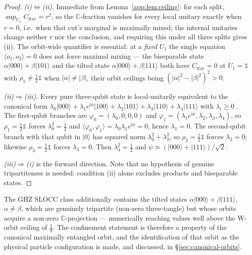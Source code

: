 \begin{proof}
\emph{(i)$\Leftrightarrow$(ii).} Immediate from Lemma~\ref{app:lem:ceiling}: for each split,
$\sup_{U_1}C_{\mathrm{frac}} = r^2$, so the $\mathbb{C}$-fraction vanishes for every local unitary
exactly when $r = 0$, i.e.\ when that cut's marginal is maximally mixed; the internal unitaries
change neither $r$ nor the conclusion, and requiring this under all three splits gives (ii). The
orbit-wide quantifier is essential: at a \emph{fixed} $U_1$ the single equation
$\langle o_1,o_2\rangle = 0$ does not force maximal mixing --- the biseparable state
$\alpha\lvert000\rangle+\beta\lvert101\rangle$ and the tilted state
$\alpha\lvert000\rangle+\beta\lvert111\rangle$ both have $C_{\mathrm{frac}} = 0$ at $U_1=\mathbb{1}$
with $\rho_1\neq\tfrac12\mathbb{1}$ when $|\alpha|\neq|\beta|$, their orbit ceilings being
$(|\alpha|^2-|\beta|^2)^2 > 0$.

\emph{(ii)$\Rightarrow$(iii).} Every pure three-qubit state is local-unitarily equivalent to the
canonical form
$\lambda_0\lvert000\rangle + \lambda_1e^{\mathrm{i}\phi}\lvert100\rangle + \lambda_2\lvert101\rangle
+ \lambda_3\lvert110\rangle + \lambda_4\lvert111\rangle$ with $\lambda_i\ge0$
\autocite{acin2000generalized}. The first-qubit branches are $\varphi_0 = (\lambda_0,0,0,0)$ and
$\varphi_1 = (\lambda_1e^{\mathrm{i}\phi},\lambda_2,\lambda_3,\lambda_4)$, so
$\rho_1 = \tfrac12\mathbb{1}$ forces $\lambda_0^2 = \tfrac12$ and
$\langle\varphi_0,\varphi_1\rangle = \lambda_0\lambda_1e^{\mathrm{i}\phi} = 0$, hence
$\lambda_1 = 0$. The second-qubit branch with that qubit in $\lvert0\rangle$ has squared norm
$\lambda_0^2+\lambda_2^2$, so $\rho_2 = \tfrac12\mathbb{1}$ forces $\lambda_2 = 0$; likewise
$\rho_3 = \tfrac12\mathbb{1}$ forces $\lambda_3 = 0$. Then $\lambda_4^2 = \tfrac12$ and
$\psi \simeq (\lvert000\rangle+\lvert111\rangle)/\sqrt2$.

\emph{(iii)$\Rightarrow$(i)} is the forward direction. Note that no hypothesis of genuine
tripartiteness is needed: condition (ii) alone excludes products and biseparable states.
\end{proof}

\begin{remark}
The GHZ SLOCC class additionally contains the tilted states
$\alpha\lvert000\rangle+\beta\lvert111\rangle$, $\alpha\neq\beta$, which are genuinely tripartite
(non-zero three-tangle) but whose orbits acquire a non-zero $\mathbb{C}$-projection --- numerically
reaching values well above the W-orbit ceiling of $\tfrac19$. The confinement statement is therefore
a property of the canonical maximally entangled orbit, and the identification of that orbit as the
physical particle configuration is made, and discussed, in \S\ref{sec:canonical-orbits}.
\end{remark}

